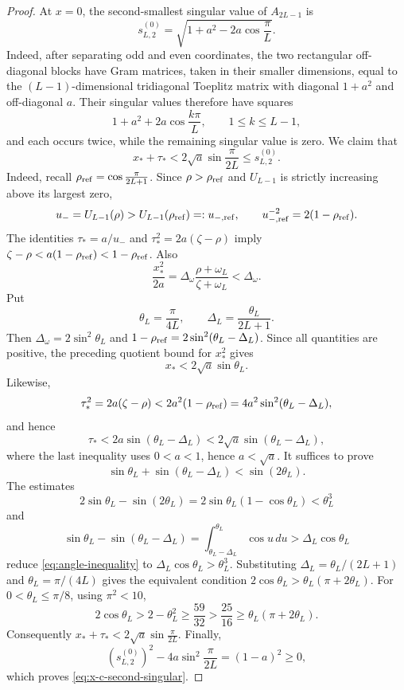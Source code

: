 \documentclass[preprints,article,accept,oneauthor]{Definitions/mdpi}
\numberwithin{equation}{section}
\theoremstyle{mdpi}
\theoremstyle{definition}
\begin{document}
\begin{proof}
At \(x=0\), the second-smallest singular value of \(A_{2L-1}\) is
\[
 s_{L,2}^{(0)}=\sqrt{1+a^2-2a\cos\frac{\pi}{L}}.
\]
Indeed, after separating odd and even coordinates, the two rectangular
off-diagonal blocks have Gram matrices, taken in their smaller dimensions, equal to the
\((L-1)\)-dimensional tridiagonal Toeplitz matrix with diagonal
\(1+a^2\) and off-diagonal \(a\).  Their singular values therefore have
squares
\[
 1+a^2+2a\cos\frac{k\pi}{L},\qquad 1\leq k\leq L-1,
\]
and each occurs twice, while the remaining singular value is zero.
We claim that
\begin{equation}\label{eq:x-c-second-singular}
 x_*+\tau_*<2\sqrt a\sin\frac{\pi}{2L}\leq s_{L,2}^{(0)}.
\end{equation}
Indeed, recall \(\rho_{\rm ref}=\cos\frac{\pi}{2L+1}\).  Since
\(\rho>\rho_{\rm ref}\) and \(U_{L-1}\) is strictly increasing above its
largest zero,
\[
 u_-=U_{L-1}(\rho)>U_{L-1}(\rho_{\rm ref})=:u_{-,\rm ref},
 \qquad u_{-,\rm ref}^{-2}=2(1-\rho_{\rm ref}).
\]
The identities \(\tau_*=a/u_-\) and \(\tau_*^2=2a(\zeta-\rho)\) imply
\(\zeta-\rho<a(1-\rho_{\rm ref})<1-\rho_{\rm ref}\).  Also
\[
 \frac{x_*^2}{2a}
 =\Delta_\omega\frac{\rho+\omega_L}{\zeta+\omega_L}
 <\Delta_\omega.
\]
Put
\[
 \theta_L=\frac{\pi}{4L},\qquad
 \Delta_L=\frac{\theta_L}{2L+1}.
\]
Then \(\Delta_\omega=2\sin^2\theta_L\) and
\(1-\rho_{\rm ref}=2\sin^2(\theta_L-\Delta_L)\).  Since all quantities are
positive, the preceding quotient bound for \(x_*^2\) gives
\[
 x_*<2\sqrt a\sin\theta_L.
\]
Likewise,
\[
 \tau_*^2=2a(\zeta-\rho)
 <2a^2(1-\rho_{\rm ref})
 =4a^2\sin^2(\theta_L-\Delta_L),
\]
and hence
\[
 \tau_*<2a\sin(\theta_L-\Delta_L)
 <2\sqrt a\sin(\theta_L-\Delta_L),
\]
where the last inequality uses \(0<a<1\), hence \(a<\sqrt a\).
It suffices to prove
\begin{equation}\label{eq:angle-inequality}
 \sin\theta_L+\sin(\theta_L-\Delta_L)<\sin(2\theta_L).
\end{equation}
The estimates
\[
 2\sin\theta_L-\sin(2\theta_L)
 =2\sin\theta_L(1-\cos\theta_L)<\theta_L^3
\]
and
\[
 \sin\theta_L-\sin(\theta_L-\Delta_L)
 =\int_{\theta_L-\Delta_L}^{\theta_L}\cos u\,du
 >\Delta_L\cos\theta_L
\]
reduce \eqref{eq:angle-inequality} to
\(\Delta_L\cos\theta_L>\theta_L^3\).  Substituting
\(\Delta_L=\theta_L/(2L+1)\) and \(\theta_L=\pi/(4L)\) gives the equivalent
condition \(2\cos\theta_L>\theta_L(\pi+2\theta_L)\).  For
\(0<\theta_L\leq\pi/8\), using \(\pi^2<10\),
\[
 2\cos\theta_L>2-\theta_L^2\geq\frac{59}{32}
 >\frac{25}{16}\geq\theta_L(\pi+2\theta_L).
\]
Consequently \(x_*+\tau_*<2\sqrt a\sin\frac{\pi}{2L}\).  Finally,
\[
 (s_{L,2}^{(0)})^2-4a\sin^2\frac{\pi}{2L}
 =(1-a)^2\geq0,
\]
which proves \eqref{eq:x-c-second-singular}.


\end{proof}
\end{document}
